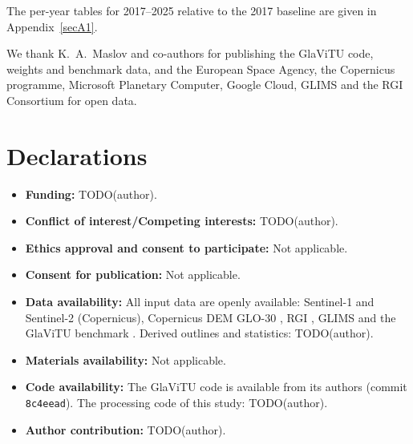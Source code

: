 \documentclass[pdflatex,sn-mathphys-num]{sn-jnl}%
\theoremstyle{thmstyleone}%
\theoremstyle{thmstyletwo}%
\theoremstyle{thmstylethree}%
\begin{document}
The per-year tables for 2017--2025 relative to the 2017 baseline are given in Appendix~\ref{secA1}. %


We thank K.~A.~Maslov and co-authors for publishing the GlaViTU code, weights and benchmark data, and the European Space Agency, the Copernicus programme, Microsoft Planetary Computer, Google Cloud, GLIMS and the RGI Consortium for open data. %

\section*{Declarations}

\begin{itemize}
\item \textbf{Funding:} TODO(author).
\item \textbf{Conflict of interest/Competing interests:} TODO(author).
\item \textbf{Ethics approval and consent to participate:} Not applicable.
\item \textbf{Consent for publication:} Not applicable.
\item \textbf{Data availability:} All input data are openly available: Sentinel-1 and Sentinel-2 (Copernicus), Copernicus DEM GLO-30 \cite{copdem}, RGI \cite{rgi6,rgi7}, GLIMS \cite{raup2007} and the GlaViTU benchmark \cite{maslov2024data}. Derived outlines and statistics: TODO(author).
\item \textbf{Materials availability:} Not applicable.
\item \textbf{Code availability:} The GlaViTU code is available from its authors \cite{maslov2025} (commit \texttt{8c4eead}). The processing code of this study: TODO(author).
\item \textbf{Author contribution:} TODO(author).
\end{itemize}
\end{document}
